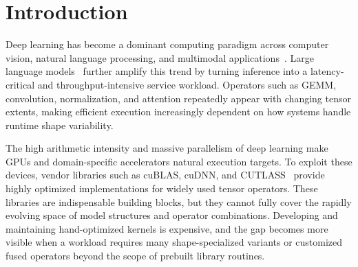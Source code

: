 \section{Introduction}
\label{sec:introduction}


Deep learning has become a dominant computing paradigm across computer vision,
natural language processing, and multimodal
applications~\cite{ren2015faster,vaswani2017A,devlin2019bert}. 
Large language models~\cite{touvron2023llama} 
further amplify this trend by turning inference into a latency-critical and throughput-intensive 
service workload.
Operators such as GEMM, convolution,
normalization, and attention repeatedly appear with changing tensor extents, 
making efficient execution increasingly dependent on how systems handle
runtime shape variability.

The high arithmetic intensity and massive parallelism of deep learning make
GPUs and domain-specific accelerators natural execution targets. To exploit
these devices, vendor libraries such as cuBLAS, cuDNN, and CUTLASS~\cite{nvidia24cublas,chetlur2014cudnn,nvidia22cutlass} 
provide highly optimized implementations for widely used tensor
operators. These libraries are indispensable building blocks, but they cannot 
fully cover the rapidly evolving space of model structures and operator combinations. 
Developing and maintaining hand-optimized kernels is expensive, and the gap becomes 
more visible when a workload requires many shape-specialized variants or customized 
fused operators beyond the scope of prebuilt library routines.

